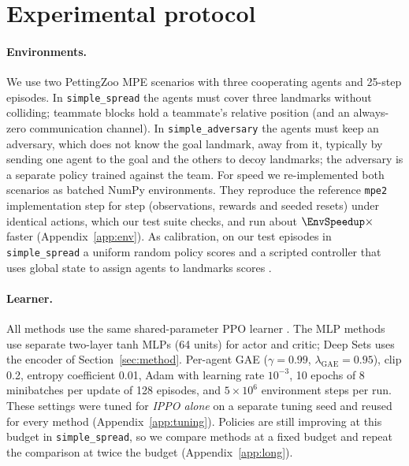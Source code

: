 \section{Experimental protocol}
\label{sec:setup}

\paragraph{Environments.}
We use two PettingZoo MPE scenarios \citep{lowe2017maddpg,mordatch2018emergence,terry2021pettingzoo}
with three cooperating agents and 25-step episodes. In \texttt{simple\_spread}
the agents must cover three landmarks without colliding; teammate blocks hold a
teammate's relative position (and an always-zero communication channel). In
\texttt{simple\_adversary} the agents must keep an adversary, which does not
know the goal landmark, away from it, typically by sending one agent to the goal
and the others to decoy landmarks; the adversary is a separate policy trained
against the team. For speed we re-implemented both scenarios as batched NumPy
environments. They reproduce the reference \texttt{mpe2} implementation step for
step (observations, rewards and seeded resets) under identical actions, which our
test suite checks, and run about $\EnvSpeedup\times$ faster
(Appendix~\ref{app:env}). As calibration, on our test episodes in
\texttt{simple\_spread} a uniform random policy scores \RefRandom{} and a
scripted controller that uses global state to assign agents to landmarks scores
\RefAssign.

\paragraph{Learner.}
All methods use the same shared-parameter PPO learner
\citep{schulman2017ppo,dewitt2020ippo,yu2022mappo}. The MLP methods use
separate two-layer tanh MLPs (64 units) for actor and critic; Deep Sets uses the
encoder of Section~\ref{sec:method}. Per-agent GAE \citep{schulman2016gae}
($\gamma{=}0.99$, $\lambda_{\mathrm{GAE}}{=}0.95$), clip 0.2, entropy
coefficient 0.01, Adam with learning rate $10^{-3}$, 10 epochs of 8 minibatches
per update of 128 episodes, and $5\times10^{6}$ environment steps per run. These
settings were tuned for \emph{IPPO alone} on a separate tuning seed and reused
for every method (Appendix~\ref{app:tuning}). Policies are still improving at
this budget in \texttt{simple\_spread}, so we compare methods at a fixed budget
and repeat the comparison at twice the budget (Appendix~\ref{app:long}).

